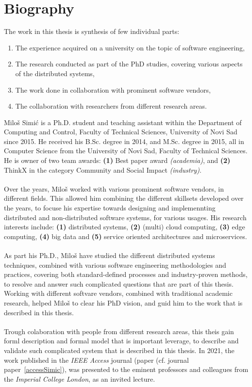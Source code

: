 \chapter*{Biography}
%
The work in this thesis is synthesis of few individual parts:

\begin{enumerate}[start=1,label={(\bfseries \arabic*)}]
	\item The experience acquired on a university on the topic of software engineering,
	\item The research conducted as part of the PhD studies, covering various aspects of the distributed systems,
	\item The work done in collaboration with prominent software vendors,
	\item The collaboration with researchers from different research areas.
\end{enumerate}

\noindent
Milo\v s Simi\'c is a Ph.D. student and teaching assistant within the Department of Computing and Control, Faculty of Technical Sciences, University of Novi Sad since 2015. He received his B.Sc. degree in 2014, and M.Sc. degree in 2015, all in Computer Science from the University of Novi Sad, Faculty of Technical Sciences. He is owner of two team awards: \textbf{(1)} Best paper award \emph{(academia)}, and \textbf{(2)} ThinkX in the category Community and Social Impact \emph{(industry)}.\\\\ 
\noindent
Over the years, Milo\v s worked with various prominent software vendors, in different fields. This allowed him combining the different skillsets developed over the years, to focuse his expertise towards designing and implemennting distributed and non-distributed software systems, for various usages. His research interests include: \textbf{(1)} distributed systems, \textbf{(2)} (multi) cloud computing, \textbf{(3)} edge computing, \textbf{(4)} big data and \textbf{(5)} service oriented architectures and microservices.\\\\
\noindent
As part his Ph.D., Milo\v s have studied the different distributed systems techniques, combined with various software engineering methodologies and practices, covering both standard-defined processes and industry-proven methods, to resolve and answer such complicated questions that are part of this thesis. Working with different softvare vendors, combined with traditional academic research, helped Milo\v s to clear his PhD vision, and guid him to the work that is described in this thesis.\\\\
\noindent
Trough colaboration with people from different research areas, this theis gain forml description and formal model that is important leverage, to describe and validate such complicated system that is described in this thesis. In 2021, the work published in the \emph{IEEE Access} journal (paper (cf. journal paper~\ref{accessSimic}), was presented to the eminent professors and colleagues from the \emph{Imperial College London}, as an invited lecture.
%
%